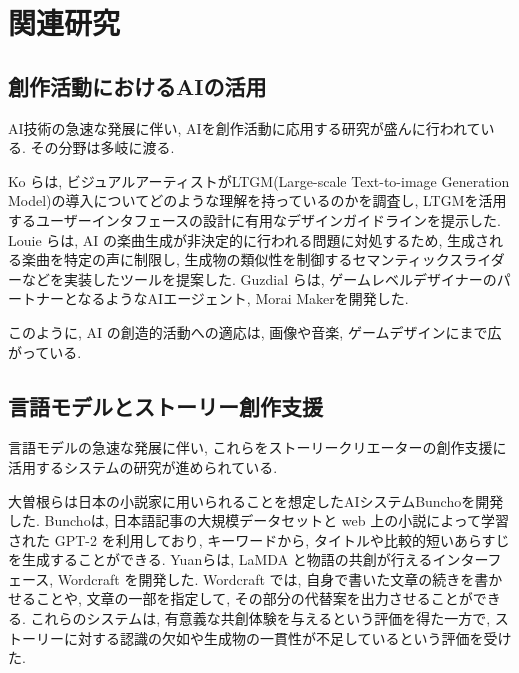 \section{関連研究}
\subsection{創作活動におけるAIの活用}
AI技術の急速な発展に伴い, AIを創作活動に応用する研究が盛んに行われている. その分野は多岐に渡る. 

Ko ら\cite{ref:Ko23}は, ビジュアルアーティストがLTGM(Large-scale Text-to-image Generation Model)の導入についてどのような理解を持っているのかを調査し, LTGMを活用するユーザーインタフェースの設計に有用なデザインガイドラインを提示した. Louie ら\cite{ref:Louie20}は, AI の楽曲生成が非決定的に行われる問題に対処するため, 生成される楽曲を特定の声に制限し, 生成物の類似性を制御するセマンティックスライダーなどを実装したツールを提案した. Guzdial ら\cite{ref:Guzdial19}は, ゲームレベルデザイナーのパートナーとなるようなAIエージェント, Morai Makerを開発した.

このように, AI の創造的活動への適応は, 画像や音楽, ゲームデザインにまで広がっている.
\subsection{言語モデルとストーリー創作支援}
言語モデルの急速な発展に伴い, これらをストーリークリエーターの創作支援に活用するシステムの研究が進められている.

大曽根ら\cite{ref:Osone21}は日本の小説家に用いられることを想定したAIシステムBunchoを開発した. Bunchoは, 日本語記事の大規模データセットと web 上の小説によって学習された GPT-2\cite{ref:Radford20} を利用しており, キーワードから, タイトルや比較的短いあらすじを生成することができる. Yuanら\cite{ref:Yuan22}は, LaMDA\cite{ref:Thoppilan22} と物語の共創が行えるインターフェース, Wordcraft を開発した. Wordcraft では, 自身で書いた文章の続きを書かせることや, 文章の一部を指定して, その部分の代替案を出力させることができる. これらのシステムは, 有意義な共創体験を与えるという評価を得た一方で, ストーリーに対する認識の欠如や生成物の一貫性が不足しているという評価を受けた.


